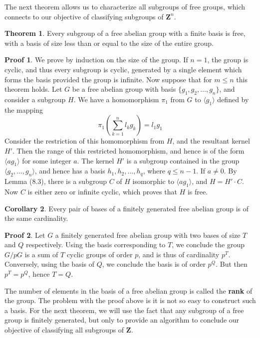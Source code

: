 \documentclass[12pt]{amsbook}
\theoremstyle{definition}
\newtheorem{theorem}{Theorem}[chapter]
\newtheorem{corollary}[theorem]{Corollary}
\newtheorem*{prf}{Proof}
\newcommand{\bint}{\mathbf{Z}} %
\newcommand{\gen}[1]{\langle #1 \rangle} %
\begin{document}
The next theorem allows us to characterize all subgroups of free groups, which connects to our objective of classifying subgroups of $\mathbf{Z}^n$.

\begin{theorem}
    Every subgroup of a free abelian group with a finite basis is free, with a basis of size less than or equal to the size of the entire group.
\end{theorem}
\begin{prf}
    We prove by induction on the size of the group. If $n = 1$, the group is cyclic, and thus every subgroup is cyclic, generated by a single element which forms the basis provided the group is infinite. Now suppose that for $m \leq n$ this theorem holds. Let $G$ be a free abelian group with basis $\{ g_1, g_2, \dots, g_n \}$, and consider a subgroup $H$. We have a homomorphism $\pi_1$ from $G$ to $\gen{g_1}$ defined by the mapping
    \[ \pi_1(\sum_{k = 1}^n l_kg_k) = l_1g_1 \]
    Consider the restriction of this homomorphism from $H$, and the resultant kernel $H'$. Then the range of this restricted homomorphism, and hence is of the form $\gen{ag_1}$ for some integer $a$. The kernel $H'$ is a subgroup contained in the group $\gen{g_2, \dots, g_n}$, and hence has a basis $h_1, h_2, \dots, h_q$, where $q \leq n-1$. If $a \neq 0$. By Lemma (8.3), there is a subgroup $C$ of $H$ isomorphic to $\gen{ag_1}$, and $H = H' \cdotp C$. Now $C$ is either zero or infinite cyclic, which proves that $H$ is free.
\end{prf}

\begin{corollary}
    Every pair of bases of a finitely generated free abelian group is of the same cardinality.
\end{corollary}
\begin{prf}
    Let $G$ a finitely generated free abelian group with two bases of size $T$ and $Q$ respectively. Using the basis corresponding to $T$, we conclude the group $G/pG$ is a sum of $T$ cyclic groups of order $p$, and is thus of cardinality $p^T$. Conversely, using the basis of $Q$, we conclude the basis is of order $p^Q$. But then $p^T = p^Q$, hence $T = Q$.
\end{prf}

The number of elements in the basis of a free abelian group is called the {\bf rank} of the group. The problem with the proof above is it is not so easy to construct such a basis. For the next theorem, we will use the fact that any subgroup of a free group is finitely generated, but only to provide an algorithm to conclude our objective of classifying all subgroups of $\bint$.
\end{document}
